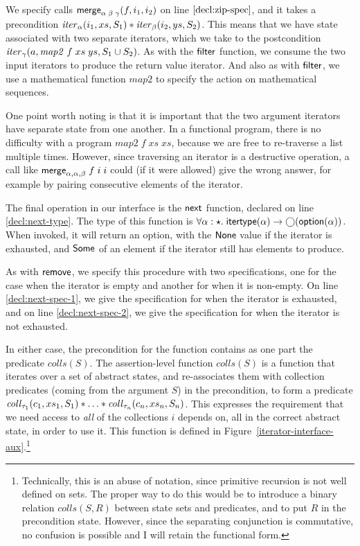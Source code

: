 We specify calls $\mathsf{merge}_{\alpha\;\beta\;\gamma}(f, i_1, i_2)$ on line
$\ref{decl:zip-spec}$, and it takes a precondition
$\mathit{iter}_\alpha(i_1, xs, S_1) * \mathit{iter}_\beta(i_2, ys, S_2)$.
This means that we have state associated with two separate iterators,
which we take to the postcondition $\mathit{iter}_{\gamma}(a,
\mathit{map2}\;f\;xs\;ys, S_1 \cup S_2)$. As with the $\mathsf{filter}$ function, 
we consume the two input iterators to produce the return value iterator. 
And also as with $\mathsf{filter}$, we use a mathematical function $\mathit{map2}$
to specify the action on mathematical sequences. 

One point worth noting is that it is important that the two argument
iterators have separate state from one another. In a functional
program, there is no difficulty with a program
$\mathit{map2}\;f\;xs\;xs$, because we are free to re-traverse a list
multiple times. However, since traversing an iterator is a destructive
operation, a call like $\mathsf{merge}_{\alpha,\alpha,\beta}\;f\;i\;i$
could (if it were allowed) give the wrong answer, for example by
pairing consecutive elements of the iterator.

The final operation in our interface is the $\mathsf{next}$ function,
declared on line \ref{decl:next-type}. The type of this function
is $\forall \alpha:\star.\; \mathsf{itertype}(\alpha) \to
\bigcirc{(\mathsf{option }{(\alpha)})}$.  When invoked, it will return an
option, with the $\mathsf{None}$ value if the iterator is exhausted,
and $\mathsf{Some}$ of an element if the iterator still has elements to
produce.

As with $\mathsf{remove}$, we specify this procedure with two
specifications, one for the case when the iterator is empty and
another for when it is non-empty. On line \ref{decl:next-spec-1}, we
give the specification for when the iterator is exhausted, and
on line \ref{decl:next-spec-2}, we give the specification for when
the iterator is not exhausted.  

In either case, the precondition for the function contains as one part
the predicate $\mathit{colls}(S)$.  The assertion-level function
$\mathit{colls}(S)$ is a function that iterates over a set of abstract
states, and re-associates them with collection predicates (coming from
the argument $S$) in the precondition, to form a predicate
$\mathit{coll}_{\tau_1}(c_1, xs_1, S_1) * \ldots * \mathit{coll}_{\tau_n}(c_n,
xs_n, S_n)$.  This expresses the requirement that we need access to
\emph{all} of the collections $i$ depends on, all in the correct
abstract state, in order to use it. 
This function is defined in
Figure~\ref{iterator-interface-aux}.\footnote{Technically, this is an
  abuse of notation, since primitive recursion is not well defined on
  sets.  The proper way to do this would be to introduce a binary
  relation $\mathit{colls(S, R)}$ between state sets and predicates,
  and to put $R$ in the precondition state. However, since the
  separating conjunction is commutative, no confusion is possible and
  I will retain the functional form.}

